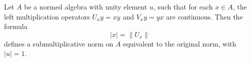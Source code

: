 Let $A$ be a normed algebra with unity element $u$, such that for each $x \in A$, the left multiplication operators $U_x y = xy$ and $V_x y = yx$ are continuous. Then the formula
$$
|x| = \|U_x\|
$$
defines a submultiplicative norm on $A$ equivalent to the original norm, with $|u| = 1$.
